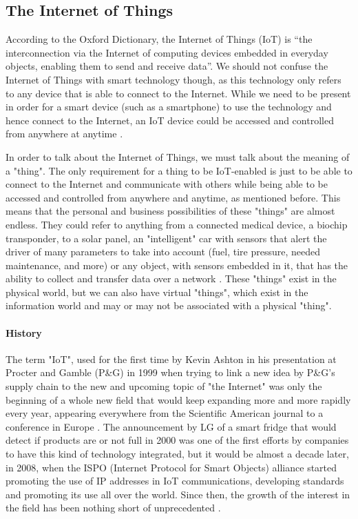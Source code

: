 \documentclass{article}
\begin{document}
\subsection{The Internet of Things}

According to the Oxford Dictionary, the Internet of Things (IoT) is “the interconnection via the Internet of computing devices embedded in everyday objects, enabling them to send and receive data”. 
We should not confuse the Internet of Things with smart technology though, as this technology only refers to any device that is able to connect to the Internet. While we need to be present in order for a smart device (such as a smartphone) to use the technology and hence connect to the Internet, an IoT device could be accessed and controlled from anywhere at anytime \cite{french2016digital}.

In order to talk about the Internet of Things, we must talk about the meaning of a "thing". The only requirement for a thing to be IoT-enabled is just to be able to connect to the Internet and communicate with others while being able to be accessed and controlled from anywhere and anytime, as mentioned before. This means that the personal and business possibilities of these "things" are almost endless. They could refer to anything from a connected medical device, a biochip transponder, to a solar panel, an "intelligent" car with sensors that alert the driver of many parameters to take into account (fuel, tire pressure, needed maintenance, and more) or any object, with sensors embedded in it, that has the ability to collect and transfer data over a network \cite{aeris}. These "things" exist in the physical world, but we can also have virtual "things", which exist in the information world and may or may not be associated with a physical "thing". 

\paragraph*{History\newline\newline}

The term "IoT", used for the first time by Kevin Ashton in his presentation at Procter and Gamble (P\&G) in 1999 when trying to link a new idea by P\&G's supply chain to the new and upcoming topic of "the Internet" was only the beginning of a whole new field that would keep expanding more and more rapidly every year, appearing everywhere from the Scientific American journal to a conference in Europe \cite{ashton}. The announcement by LG of a smart fridge that would detect if products are or not full in 2000 was one of the first efforts by companies to have this kind of technology integrated, but it would be almost a decade later, in 2008, when the ISPO (Internet Protocol for Smart Objects) alliance started promoting the use of IP addresses in IoT communications, developing standards and promoting its use all over the world. Since then, the growth of the interest in the field has been nothing short of unprecedented \cite{suresh}.
\end{document}
